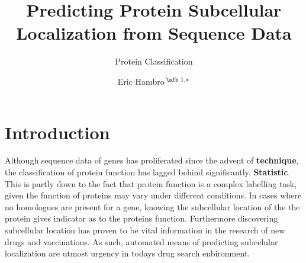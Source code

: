 \documentclass{bioinfo}
\begin{document}

\subtitle{Protein Classification}

\title[short Title]{Predicting Protein Subcellular Localization from Sequence Data}
\author[Sample \textit{et~al}.]{Eric Hambro\,$^{\text{\sfb 1,}*}$}
\address{$^{\text{\sf 1}}$Department, Institution, City, Post Code, Country}


\history{ }

\editor{ }


\maketitle


\section{Introduction}



Although sequence data of genes has proliferated since the advent of \textbf{technique}, the classification of protein function has lagged behind significantly.  \textbf{Statistic}. 
This is partly down to the fact that protein function is a complex labelling task, given the function of proteins may vary under different conditions.  
In cases where no homologues are present for a gene, knowing the subcellular location of the the protein gives indicator as to the proteins function. 
Furthermore discovering subcellular location has proven to be vital information in the research of new drugs and vaccinations. 
As such, automated means of predicting subcelular localization are utmost urgency in todays drug search enbironment.
\end{document}
